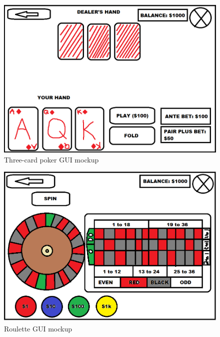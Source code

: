 \documentclass[10pt,conference,onecolumn,compsoc]{IEEEtran}
\begin{document}
\begin{figure}[h]
\caption{Three-card poker GUI mockup}
\includegraphics[scale=0.4]{three-card}
\centering
\end{figure}

\begin{figure}[h]
\caption{Roulette GUI mockup}
\includegraphics[scale=0.4]{roulette}
\centering
\end{figure}

\end{document}
